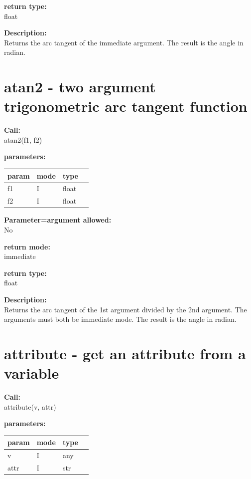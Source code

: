         {\bf return type:} \\
        float
        
        {\bf Description:} \\
        Returns the arc tangent of the immediate argument. The result is the
        angle in radian.


    \section{atan2 - two argument trigonometric arc tangent function}\label{sec:ifatan2}
        
        
        {\bf Call:} \\
        atan2(f1, f2)
        
        {\bf parameters:} \\
        \begin{tabular}{| l | l | l | l |}
        \hline
        param  & mode & type & \\
        \hline \hline
        f1 & I & float & \\ \hline
        f2 & I & float & \\ \hline
        \end{tabular}
        
        {\bf Parameter=argument allowed:} \\
        No
        
        {\bf return mode:} \\
        immediate

        {\bf return type:} \\
        float
        
        {\bf Description:} \\
        Returns the arc tangent of the 1st argument divided by the 2nd
        argument. The arguments must both be immediate mode. The result is the
        angle in radian.


    \section{attribute - get an attribute from a variable}\label{sec:ifattribute}
        
        
        {\bf Call:} \\
        attribute(v, attr)
        
        {\bf parameters:} \\
        \begin{tabular}{| l | l | l | l |}
        \hline
        param  & mode & type & \\
        \hline \hline
        v        & I & any & \\ \hline
        attr     & I & str & \\ \hline
        \end{tabular}
        

